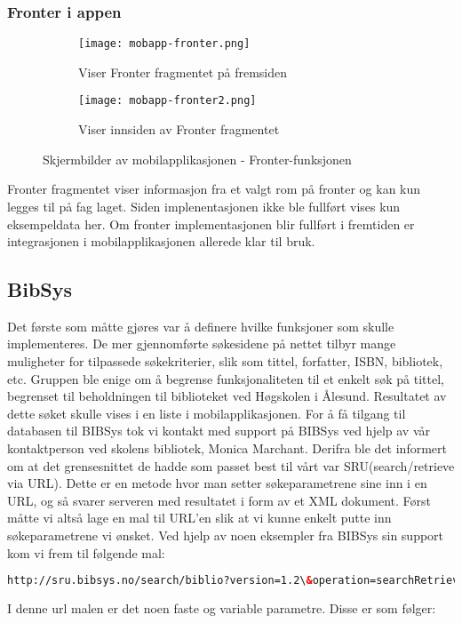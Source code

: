 \documentclass[../main.tex]{subfiles}
\begin{document}
\subsubsection{Fronter i appen}

\begin{figure}[H]
        \centering
        \begin{subfigure}[b]{0.3\textwidth}
                \centering
                \texttt{[image: mobapp-fronter.png]}
                \caption{Viser Fronter fragmentet på fremsiden}
        \end{subfigure}
        \quad
        \begin{subfigure}[b]{0.3\textwidth}
                \centering
                \texttt{[image: mobapp-fronter2.png]}
                \caption{Viser innsiden av Fronter fragmentet}
        \end{subfigure}
        \caption{Skjermbilder av mobilapplikasjonen - Fronter-funksjonen}
\end{figure}

Fronter fragmentet viser informasjon fra et valgt rom på fronter og kan kun legges til på fag laget. Siden implenentasjonen ikke ble fullført vises kun eksempeldata her. Om fronter implementasjonen blir fullført i fremtiden er integrasjonen i mobilapplikasjonen allerede klar til bruk. 

\subsection{BibSys}

Det første som måtte gjøres var å definere hvilke funksjoner som skulle implementeres. De mer gjennomførte søkesidene på nettet tilbyr mange muligheter for tilpassede søkekriterier, slik som tittel, forfatter, ISBN, bibliotek, etc.  Gruppen ble enige om å begrense funksjonaliteten til et enkelt søk på tittel, begrenset til beholdningen til biblioteket ved Høgskolen i Ålesund. Resultatet av dette søket skulle vises i en liste i mobilapplikasjonen.\newline
\newline
For å få tilgang til databasen til BIBSys tok vi kontakt med support på BIBSys ved hjelp av vår kontaktperson ved skolens bibliotek, Monica Marchant. Derifra ble det informert om at det grensesnittet de hadde som passet best til vårt var SRU(search/retrieve via URL). Dette er en metode hvor man setter søkeparametrene sine inn i en URL, og så svarer serveren med resultatet i form av et XML dokument.
\newline
Først måtte vi altså lage en mal til URL’en slik at vi kunne enkelt putte inn søkeparametrene vi ønsket. Ved hjelp av noen eksempler fra BIBSys sin support kom vi frem til følgende mal:
\newline
\begin{lstlisting}[language=HTML, frame=single]
http://sru.bibsys.no/search/biblio?version=1.2\&operation=searchRetrieve\&startRecord=1\&maximumRecords=10\&query=bs.bibkode=xb\%20AND\%20bs.tittel=ibsen
\end{lstlisting}
I denne url malen er det noen faste og variable parametre. Disse er som følger:
\end{document}
